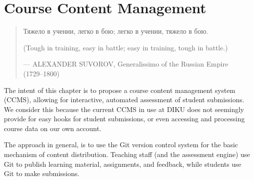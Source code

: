 
\chapter{Course Content Management}

\label{section:infrastructure}

\begin{quotation}

\footnotesize\sffamily\itshape

\begin{flushright}


Тяжело в учении, легко в бою; легко в учении, тяжело в бою.


\smallbreak

(Tough in training, easy in battle; easy in training, tough in battle.)

\smallbreak

\upshape

--- ALEXANDER SUVOROV, Generalissimo of the Russian Empire (1729--1800)

\end{flushright}

\end{quotation}

The intent of this chapter is to propose a course content management system
(CCMS), allowing for interactive, automated assessment of student submissions.
We consider this because the current CCMS in use at DIKU does not seemingly
provide for easy hooks for student submissions, or even accessing and
processing course data on our own account.

The approach in general, is to use the Git version control system for the basic
mechanism of content distribution. Teaching staff (and the assessment engine)
use Git to publish learning material, assignments, and feedback, while students
use Git to make submissions.



